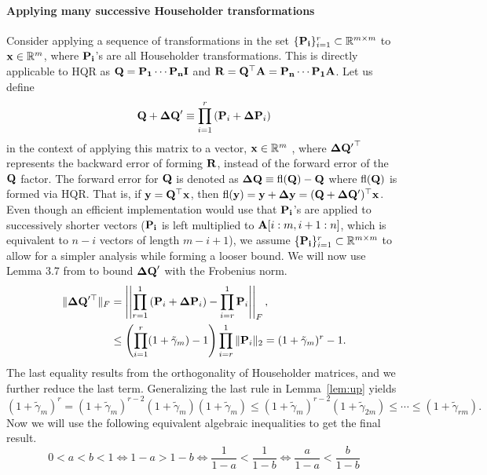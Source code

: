 \paragraph{Applying many successive Householder transformations}
Consider applying a sequence of transformations in the set $\{\mathbf{P_i}\}_{i=1}^r\subset\mathbb{R}^{m\times m}$ to $\mathbf{x}\in\mathbb{R}^m$, where $\mathbf{P_i}$'s are all Householder transformations.
This is directly applicable to HQR as $\mathbf{Q}=\mathbf{P_1}\cdots\mathbf{P_n}\mathbf{I}$ and $\mathbf{R} = \mathbf{Q}^{\top}\mathbf{A} = \mathbf{P_n}\cdots\mathbf{P_1}\mathbf{A}$.
Let us define $$\mathbf{Q}+\mathbf{\Delta Q'}\equiv \prod_{i=1}^{r}\left(\mathbf{P}_i +\mathbf{\Delta P}_i\right)$$ in the context of applying this matrix to a vector, $\mathbf{x}\in\mathbb{R}^m$ , where $\mathbf{\Delta Q'}^{\top}$ represents the backward error of forming $\mathbf{R}$, instead of the forward error of the $\mathbf{Q}$ factor. 
The forward error for $\mathbf{Q}$ is denoted as $\mathbf{\Delta Q} \equiv \mathrm{fl}(\mathbf{Q})-\mathbf{Q}$ where $\mathrm{fl}(\mathbf{Q})$ is formed via HQR.
That is, if $\mathbf{y} = \mathbf{Q}^{\top}\mathbf{x}$, then $\mathrm{fl}(\mathbf{y}) = \mathbf{y}+ \mathbf{\Delta y} = (\mathbf{Q}+\mathbf{\Delta Q'})^{\top}\mathbf{x}$.
Even though an efficient implementation would use that $\mathbf{P_i}$'s are applied to successively shorter vectors ($\mathbf{P_i}$ is left multiplied to $\mathbf{A}[i:m,i+1:n]$, which is equivalent to $n-i$ vectors of length $m-i+1$), we assume $\{\mathbf{P_i}\}_{i=1}^r\subset\mathbb{R}^{m\times m}$ to allow for a simpler analysis while forming a looser bound. 
We will now use Lemma 3.7 from \cite{Higham2002} to bound $\mathbf{\Delta Q}'$ with the Frobenius norm.
\begin{align}
\|\bb{\Delta Q}'^{\top}\|_F &= \left|\left| \prod_{r=1}^{1}\left(\bb{P}_i +\bb{\Delta P}_i\right) - \prod_{i=r}^{1}\bb{P}_i \right|\right|_F,\label{eqn:rPs}\\
&\leq \left(\prod_{i=1}^r(1+\tilde{\gamma}_m)-1\right)\prod_{i=r}^1\|\bb{P}_i\|_2 = (1+\tilde{\gamma}_m)^r-1. \label{eqn:rPs-uniform}
\end{align}
The last equality results from the orthogonality of Householder matrices, and we further reduce the last term.
Generalizing the last rule in Lemma~\ref{lem:up} yields
\begin{equation*}
(1+\tilde{\gamma}_m)^r = (1+\tilde{\gamma}_m)^{r-2}(1+\tilde{\gamma}_m)(1+\tilde{\gamma}_m) \leq  (1+\tilde{\gamma}_m)^{r-2}(1+\tilde{\gamma}_{2m}) \leq \cdots \leq (1+\tilde{\gamma}_{rm}).
\end{equation*}
Now we will use the following equivalent algebraic inequalities to get the final result.
\begin{equation}
0<a<b<1 \Leftrightarrow 1-a > 1-b \Leftrightarrow \frac{1}{1-a} <\frac{1}{1-b} \Leftrightarrow \frac{a}{1-a} < \frac{b}{1-b}
\label{eqn:algebra}
\end{equation}

